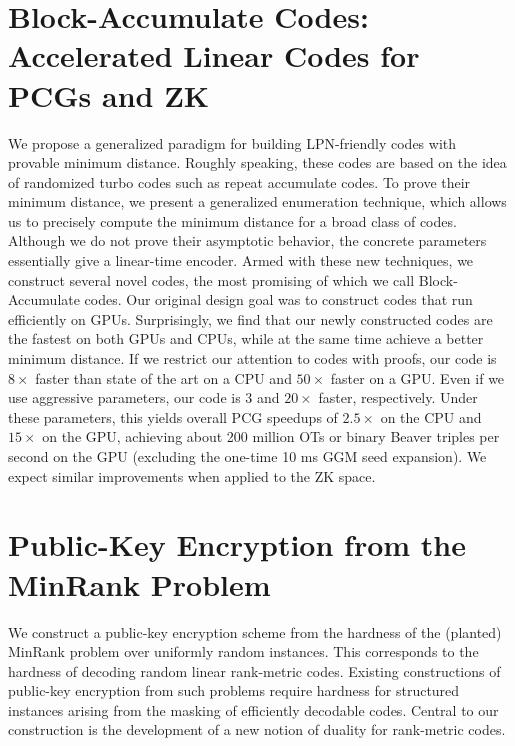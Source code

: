 \documentclass[11pt,oneside]{book}
\theoremstyle{definition}
\theoremstyle{remark}
\theoremstyle{plain}
\begin{document}
 \section{\cite{cryptoeprint:2025/1828} Block-Accumulate Codes: Accelerated Linear Codes for PCGs and ZK}
 We propose a generalized paradigm for building LPN-friendly codes with provable minimum distance. Roughly speaking, these codes are based on the idea of randomized turbo codes such as repeat accumulate codes. To prove their minimum distance, we present a generalized enumeration technique, which allows us to precisely compute the minimum distance for a broad class of codes. Although we do not prove their asymptotic behavior, the concrete parameters essentially give a linear-time encoder. Armed with these new techniques, we construct several novel codes, the most promising of which we call Block-Accumulate codes. Our original design goal was to construct codes that run efficiently on GPUs. Surprisingly, we find that our newly constructed codes are the fastest on both GPUs and CPUs, while at the same time achieve a better minimum distance. If we restrict our attention to codes with proofs, our code is $8\times$ faster than state of the art on a CPU and $50\times$ faster on a GPU. Even if we use aggressive parameters, our code is $3$ and $20\times$ faster, respectively. Under these parameters, this yields overall PCG speedups of $2.5\times$ on the CPU and $15\times$ on the GPU, achieving about 200 million OTs or binary Beaver triples per second on the GPU (excluding the one-time 10 ms GGM seed expansion). We expect similar improvements when applied to the ZK space.
 
 \section{\cite{cryptoeprint:2025/1833} Public-Key Encryption from the MinRank Problem}
 We construct a public-key encryption scheme from the hardness of the (planted) MinRank problem over uniformly random instances. This corresponds to the hardness of decoding random linear rank-metric codes. Existing constructions of public-key encryption from such problems require hardness for structured instances arising from the masking of efficiently decodable codes. Central to our construction is the development of a new notion of duality for rank-metric codes.
 
\end{document}
